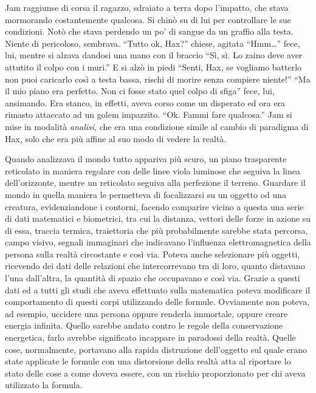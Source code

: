     Jam raggiunse di corsa il ragazzo, sdraiato a terra dopo l'impatto, che stava
    mormorando costantemente qualcosa. Si chinò su di lui per controllare
    le sue condizioni. Notò che stava perdendo un po' di sangue da un
    graffio alla testa. Niente di pericoloso, sembrava. ``Tutto ok, Hax?''
    chiese, agitata ``Hmm\dots{}'' fece, lui, mentre si alzava dandosi una
    mano con il braccio ``Sì, sì. Lo zaino deve aver attutito il colpo con
    i muri.'' E si alzò in piedi ``Senti, Hax, se vogliamo batterlo non
    puoi caricarlo così a testa bassa, rischi di morire senza compiere
    niente!'' ``Ma il mio piano era perfetto. Non ci fosse stato quel colpo
    di sfiga'' fece, lui, ansimando. Era stanco, in effetti, aveva corso
    come un disperato ed ora era rimasto attaccato ad un golem impazzito.
    ``Ok. Fammi fare qualcosa.'' Jam si mise in modalità \emph{analisi},
    che era una condizione simile al cambio di paradigma di Hax, solo che
    era più affine al suo modo di vedere la realtà.

    Quando analizzava il mondo tutto appariva più scuro, un piano
    trasparente reticolato in maniera regolare con delle linee viola
    luminose che seguiva la linea dell'orizzonte, mentre un reticolato
    seguiva alla perfezione il terreno. 
    Guardare il mondo in quella maniera le permetteva di focalizzarsi su
    un oggetto od una creatura, evidenziandone i contorni, facendo comparire vicino a questa una serie
    di dati matematici e biometrici, tra cui la distanza, vettori
    delle forze in azione su di essa, traccia termica, traiettoria che più
    probabilmente sarebbe stata percorsa, campo visivo, segnali immaginari
    che indicavano l'influenza elettromagnetica della persona sulla realtà
    circostante e così via. Poteva anche
    selezionare più oggetti, ricevendo dei dati delle relazioni che
    intercorrevano tra di loro, quanto distavano l'una dall'altra, la
    quantità di spazio che occupavano e così via. Grazie a questi dati ed
    a tutti gli studi che aveva effettuato sulla matematica poteva
    modificare il comportamento di questi corpi utilizzando delle formule.
    Ovviamente non poteva, ad esempio, uccidere una persona oppure renderla
    immortale, oppure creare energia infinita. Quello sarebbe andato contro
    le regole della conservazione energetica, farlo avrebbe significato
    incappare in paradossi della realtà. Quelle cose, normalmente,
    portavano alla rapida distruzione dell'oggetto sul quale erano state
    applicate le formule con una distorsione della realtà atta al riportare
    lo stato delle cose a come doveva essere, con un rischio proporzionato
    per chi aveva utilizzato la formula.
    
